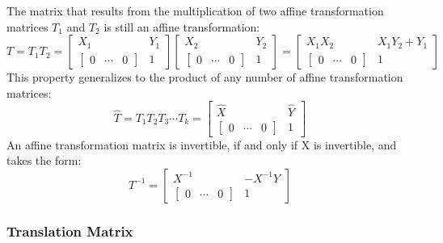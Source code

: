 The matrix that results from the multiplication of two affine transformation matrices $T_1$ and $T_2$ is still an affine transformation:
\[
T = T_1 T_2 =
\begin{bmatrix}
X_1 & Y_1 \\
\begin{bmatrix}
0 & \cdots & 0
\end{bmatrix} & 1
\end{bmatrix}
\begin{bmatrix}
X_2 & Y_2 \\
\begin{bmatrix}
0 & \cdots & 0
\end{bmatrix} & 1
\end{bmatrix}
=
\begin{bmatrix}
X_1 X_2 & X_1Y_2+Y_1 \\
\begin{bmatrix}
0 & \cdots & 0
\end{bmatrix} & 1
\end{bmatrix}
\]
This property generalizes to the product of any number of affine transformation matrices:
\[
\widehat{T} = T_1 T_2 T_3 \cdots T_k = 
\begin{bmatrix}
\widehat{X} & \widehat{Y} \\
\begin{bmatrix}
0 & \cdots & 0
\end{bmatrix} & 1
\end{bmatrix}
\]
An affine transformation matrix is invertible, if and only if X is invertible, and takes the form:
\[
T^{-1} = 
\begin{bmatrix}
X^{-1} & -X^{-1}Y \\
\begin{bmatrix}
0 & \cdots & 0
\end{bmatrix} & 1
\end{bmatrix}
\]

\subsubsection*{Translation Matrix}


